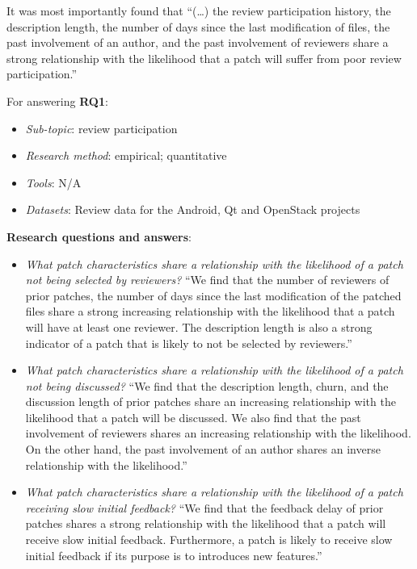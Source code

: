 \documentclass[]{book}
\providecommand{\tightlist}{%
  \setlength{\itemsep}{0pt}\setlength{\parskip}{0pt}}
\begin{document}
It was most importantly found that ``(\ldots{}) the review participation
history, the description length, the number of days since the last
modification of files, the past involvement of an author, and the past
involvement of reviewers share a strong relationship with the likelihood
that a patch will suffer from poor review participation.''

For answering \textbf{RQ1}:

\begin{itemize}
\tightlist
\item
  \emph{Sub-topic}: review participation
\item
  \emph{Research method}: empirical; quantitative
\item
  \emph{Tools}: N/A
\item
  \emph{Datasets}: Review data for the Android, Qt and OpenStack
  projects
\end{itemize}

\textbf{Research questions and answers}:

\begin{itemize}
\item
  \emph{What patch characteristics share a relationship with the
  likelihood of a patch not being selected by reviewers?} ``We find that
  the number of reviewers of prior patches, the number of days since the
  last modification of the patched files share a strong increasing
  relationship with the likelihood that a patch will have at least one
  reviewer. The description length is also a strong indicator of a patch
  that is likely to not be selected by reviewers.''
\item
  \emph{What patch characteristics share a relationship with the
  likelihood of a patch not being discussed?} ``We find that the
  description length, churn, and the discussion length of prior patches
  share an increasing relationship with the likelihood that a patch will
  be discussed. We also find that the past involvement of reviewers
  shares an increasing relationship with the likelihood. On the other
  hand, the past involvement of an author shares an inverse relationship
  with the likelihood.''
\item
  \emph{What patch characteristics share a relationship with the
  likelihood of a patch receiving slow initial feedback?} ``We find that
  the feedback delay of prior patches shares a strong relationship with
  the likelihood that a patch will receive slow initial feedback.
  Furthermore, a patch is likely to receive slow initial feedback if its
  purpose is to introduces new features.''
\end{itemize}
\end{document}
